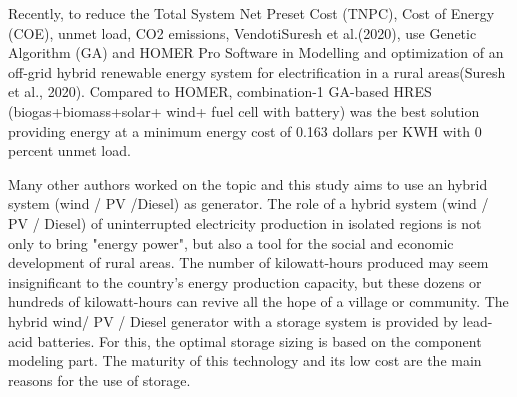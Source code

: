 \documentclass[11.8pt,a4paper]{article}
\begin{document}
Recently, to reduce the Total System Net Preset Cost (TNPC), Cost of Energy (COE), unmet load, CO2 emissions, VendotiSuresh et al.(2020), use Genetic Algorithm (GA) and HOMER Pro Software in Modelling and optimization of an off-grid hybrid renewable energy system for electrification in a rural areas(Suresh et al., 2020). Compared to HOMER, combination-1 GA-based HRES (biogas+biomass+solar+ wind+ fuel cell with battery) was the best solution providing energy at a minimum energy cost of 0.163 dollars per KWH with 0 percent unmet load. 

Many other authors worked on the topic and this study aims to use an hybrid system (wind / PV /Diesel) as generator. The role of a hybrid system (wind / PV / Diesel) of uninterrupted electricity production in isolated regions is not only to bring "energy power", but also a tool for the social and economic development of rural areas. The number of kilowatt-hours produced may seem insignificant to the country's energy production capacity, but these dozens or hundreds of kilowatt-hours can revive all the hope of a village or community. The hybrid wind/ PV / Diesel generator with a storage system is provided by lead-acid batteries. For this, the optimal storage sizing is based on the component modeling part. The maturity of this technology and its low cost are the main reasons for the use of storage.
\end{document}
